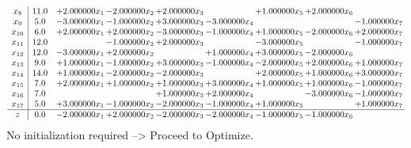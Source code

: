 \documentclass[10pt]{article}
\begin{document}
\[\begin{array}{c| c c@{\hskip 2pt} c@{\hskip 2pt} c@{\hskip 2pt} c@{\hskip 2pt} c@{\hskip 2pt} c@{\hskip 2pt} c@{\hskip 2pt} }
 x_{8}   &  11.0 & + 2.000000 x_{1} & -2.000000 x_{2} & + 2.000000 x_{3} &   & + 1.000000 x_{5} & + 2.000000 x_{6} &   \\
 x_{9}   &  5.0 & -3.000000 x_{1} & -1.000000 x_{2} & + 3.000000 x_{3} & -3.000000 x_{4} &    &   & -1.000000 x_{7}\\
 x_{10}   &  6.0 & + 2.000000 x_{1} & + 2.000000 x_{2} & -3.000000 x_{3} & -1.000000 x_{4} & + 1.000000 x_{5} & -2.000000 x_{6} & + 2.000000 x_{7}\\
 x_{11}   &  12.0  &   & -1.000000 x_{2} & + 2.000000 x_{3} &   & -3.000000 x_{5} &   & -1.000000 x_{7}\\
 x_{12}   &  12.0 & -3.000000 x_{1} & + 2.000000 x_{2} &   & + 1.000000 x_{4} & + 3.000000 x_{5} & -2.000000 x_{6} &   \\
 x_{13}   &  9.0 & + 1.000000 x_{1} & -1.000000 x_{2} & + 3.000000 x_{3} & -1.000000 x_{4} & -2.000000 x_{5} & + 2.000000 x_{6} & + 1.000000 x_{7}\\
 x_{14}   &  14.0 & + 1.000000 x_{1} & -2.000000 x_{2} & -2.000000 x_{3} &   & + 2.000000 x_{5} & + 1.000000 x_{6} & + 3.000000 x_{7}\\
 x_{15}   &  7.0 & + 2.000000 x_{1} & + 1.000000 x_{2} & + 1.000000 x_{3} & + 3.000000 x_{4} & + 1.000000 x_{5} & + 1.000000 x_{6} & -1.000000 x_{7}\\
 x_{16}   &  7.0  &    &   & + 1.000000 x_{3} & + 2.000000 x_{4} &   & -3.000000 x_{6} & -1.000000 x_{7}\\
 x_{17}   &  5.0 & + 3.000000 x_{1} & -1.000000 x_{2} & -2.000000 x_{3} & -1.000000 x_{4} & + 1.000000 x_{5} &   & + 1.000000 x_{7}\\
\hline
z    &  0.0 & -2.000000 x_{1} & + 2.000000 x_{2} & -2.000000 x_{3} & -2.000000 x_{4} & -1.000000 x_{5} & -1.000000 x_{6} &   \\
\end{array}\]
No initialization required --> Proceed to Optimize. 
\end{document}
